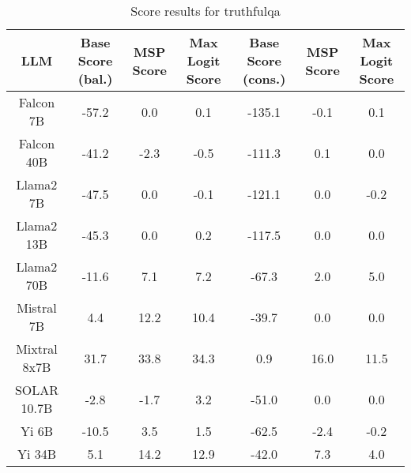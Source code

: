 \renewcommand\arraystretch{1.2}
\begin{table*}
\centering
\begin{tabular}{c|c|c|c|c|c|c}
LLM & Base Score (bal.) & MSP Score & Max Logit Score & Base Score (cons.) & MSP Score & Max Logit Score\\ \hline
Falcon 7B & -57.2 & 0.0 & 0.1 & -135.1 & -0.1 & 0.1\\
Falcon 40B & -41.2 & -2.3 & -0.5 & -111.3 & 0.1 & 0.0\\
Llama2 7B & -47.5 & 0.0 & -0.1 & -121.1 & 0.0 & -0.2\\
Llama2 13B & -45.3 & 0.0 & 0.2 & -117.5 & 0.0 & 0.0\\
Llama2 70B & -11.6 & 7.1 & 7.2 & -67.3 & 2.0 & 5.0\\
Mistral 7B & 4.4 & 12.2 & 10.4 & -39.7 & 0.0 & 0.0\\
Mixtral 8x7B & 31.7 & 33.8 & 34.3 & 0.9 & 16.0 & 11.5\\
SOLAR 10.7B & -2.8 & -1.7 & 3.2 & -51.0 & 0.0 & 0.0\\
Yi 6B & -10.5 & 3.5 & 1.5 & -62.5 & -2.4 & -0.2\\
Yi 34B & 5.1 & 14.2 & 12.9 & -42.0 & 7.3 & 4.0\\
\hline
\end{tabular}
\caption{Score results for truthfulqa}
\end{table*}
\label{tab:truthfulqa_score}
